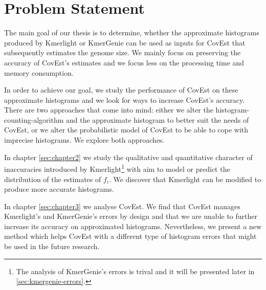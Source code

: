 \section{Problem Statement}
The main goal of our thesis is to determine, whether the approximate histograms
produced by Kmerlight or KmerGenie can be used as inputs for CovEst that 
subsequently estimates the genome size. We mainly focus on preserving the 
accuracy of CovEst's estimates and we focus less on the processing time and memory consumption. 

In order to achieve our goal, we study the performance of CovEst on these approximate
histograms and we look for ways to increase CovEst's accuracy. There are two approaches
that come into mind: either we alter the histogram-counting-algorithm and the approximate
histogram to better suit the needs of CovEst, or we alter the probabilistic model of CovEst to
be able to cope with imprecise histograms. We explore both approaches. 

In chapter \ref{sec:chapter2} we study the qualitative and quantitative character
of inaccuracies introduced by Kmerlight\footnote{The analysis of KmerGenie's errors is trival
and it will be presented later in \ref{sec:kmergenie-errors}.} with aim to model or
predict the distribution of the estimates of $f_i$. We discover that Kmerlight can be modified
to produce more accurate histograms.

In chapter \ref{sec:chapter3} we analyse CovEst. We find that CovEst manages Kmerlight's and
KmerGenie's errors by design and that we are unable to further increase its accuracy on
approximated histograms. Nevertheless, we present a new method which helps CovEst with
a different type of histogram errors that might be used in the future research.
